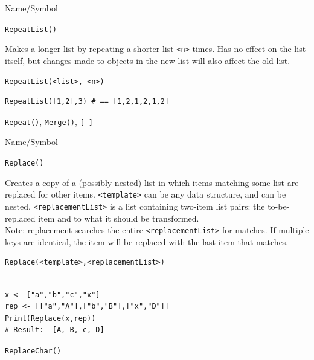 \begin{desc}{Name/Symbol}
\item[Name/Symbol] 	\verb+RepeatList()+

\item[Description]  	Makes a longer list by repeating a shorter list \verb+<n>+ times. 
	Has no effect on the list itself, but changes made to objects 
	in the new list will also affect the old list.

\item[Usage]       	
\begin{verbatim}
RepeatList(<list>, <n>)
\end{verbatim}

\item[Example]     	
\begin{verbatim}
RepeatList([1,2],3) # == [1,2,1,2,1,2]
\end{verbatim}

\item[See Also]    	\verb+Repeat()+, \verb+Merge()+, \verb+[ ]+
\end{desc}


\begin{desc}{Name/Symbol}
\item[Name/Symbol] \verb+Replace()+

\item[Description]  	Creates a copy of a (possibly nested) list in which
		items matching some list are replaced for other items.  
		\verb+<template>+ can be any data structure, and can be nested.  
		\verb+<replacementList>+ is a list containing two-item list pairs:
		the to-be-replaced item and to what it should be transformed.\\
		Note: replacement searches the entire \verb+<replacementList>+ for 
		matches.  If multiple keys are identical, the item will be 
		replaced with the last item that matches.

\item[Usage]        	
\begin{verbatim}
Replace(<template>,<replacementList>)
\end{verbatim}
			  
\item[Example]     	
\begin{verbatim}

x <- ["a","b","c","x"]
rep <- [["a","A"],["b","B"],["x","D"]]
Print(Replace(x,rep))
# Result:  [A, B, c, D] 
\end{verbatim}

\item[See Also]	
\verb+ReplaceChar()+
\end{desc}

